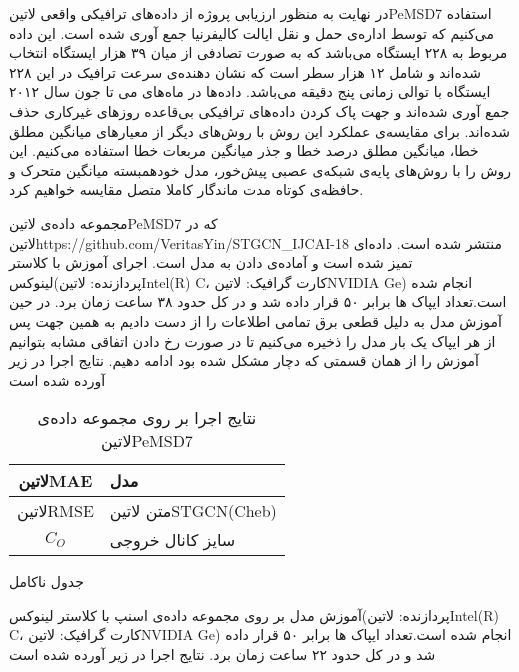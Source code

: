 
در نهایت به منظور ارزیابی پروژه از داده‌های ترافیکی واقعی ‌لاتین{PeMSD7} استفاده می‌کنیم که توسط اداره‌ی حمل و نقل ایالت کالیفرنیا جمع آوری شده است.
این داده مربوط به ۲۲۸ ایستگاه می‌باشد که به صورت تصادفی از میان ۳۹ هزار ایستگاه‌ انتخاب شده‌اند و شامل ۱۲ هزار سطر است که نشان دهنده‌ی سرعت ترافیک در این ۲۲۸ ایستگاه با توالی زمانی پنج دقیقه می‌باشد.
داده‌ها در ماه‌های می تا جون سال ۲۰۱۲ جمع آوری شده‌اند و جهت پاک کردن داده‌های ترافیکی بی‌قاعده روزهای غیرکاری حذف شده‌اند.
برای مقایسه‌ی عملکرد این روش با روش‌های دیگر از معیارهای میانگین مطلق خطا، میانگین مطلق درصد خطا و جذر میانگین مربعات خطا استفاده می‌کنیم.
این روش را با روش‌های پایه‌ی شبکه‌ی عصبی پیش‌خور، مدل خودهمبسته میانگین متحرک و حافظه‌ی کوتاه مدت ماندگار کاملا متصل  مقایسه خواهیم کرد.

مجموعه داده‌ی  لاتین{PeMSD7} که در  لاتین{https://github.com/VeritasYin/STGCN_IJCAI-18} منتشر شده است. داده‌ای تمیز شده است و آماده‌ی دادن به مدل است. اجرای آموزش با کلاستر لینوکس(پردازنده:  لاتین{Intel(R) C}، کارت گرافیک:  لاتین{NVIDIA Ge}) انجام شده است.تعداد ایپاک ها برابر ۵۰ قرار داده شد و در کل حدود ۳۸ ساعت زمان برد. در حین آموزش مدل به دلیل قطعی برق تمامی اطلاعات را از دست دادیم به همین جهت پس از هر ایپاک یک بار مدل را ذخیره می‌کنیم تا در صورت رخ دادن اتفاقی مشابه بتوانیم آموزش را از همان قسمتی که دچار مشکل شده بود ادامه دهیم. نتایج اجرا در زیر آورده شده است


\begin{table}[h]
  \centering
  \caption{نتایج اجرا بر روی مجموعه داده‌ی  لاتین{PeMSD7}}
  \begin{tabular}{|c|p{}|}
    \hline
     لاتین{MAE} & مدل \\
    \hline
     لاتین{RMSE} & متن لاتین{STGCN(Cheb)} \\
     $C_{O}$ & سایز کانال خروجی \\
    \hline
  \end{tabular}
  \label{tbl:distance}
\end{table}


جدول ناکامل

آموزش مدل بر روی مجموعه داده‌ی اسنپ با کلاستر لینوکس(پردازنده:  لاتین{Intel(R) C}، کارت گرافیک:  لاتین{NVIDIA Ge}) انجام شده است.تعداد ایپاک ها برابر ۵۰ قرار داده شد و در کل حدود ۲۲ ساعت زمان برد. نتایج اجرا در زیر آورده شده است


